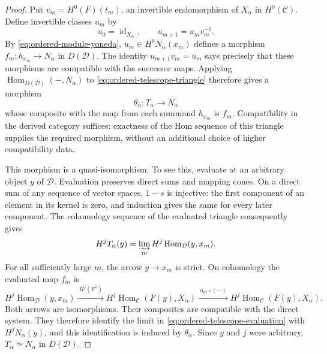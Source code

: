 \documentclass[11pt]{article}
\numberwithin{equation}{section}
\theoremstyle{definition}
\theoremstyle{remark}
\newcommand{\Hom}{\operatorname{Hom}}
\newcommand{\id}{\operatorname{id}}
\begin{document}
\begin{proof}
Put $v_m=H^0(F)(t_m)$, an invertible endomorphism of $X_\alpha$ in
$H^0(\mathcal C)$.  Define invertible classes $u_m$ by
\[
 u_0=\id_{X_\alpha},\qquad u_{m+1}=u_m v_m^{-1}.
\]
By \eqref{eq:ordered-module-yoneda}, $u_m\in H^0N_\alpha(x_m)$ defines
a morphism $f_m:h_{x_m}\to N_\alpha$ in $D(\mathcal D)$.  The identity
$u_{m+1}v_m=u_m$ says precisely that these morphisms are compatible with
the successor maps.  Applying $\Hom_{D(\mathcal D)}(-,N_\alpha)$ to
\eqref{eq:ordered-telescope-triangle} therefore gives a morphism
\[
 \theta_\alpha:T_\alpha\longrightarrow N_\alpha
\]
whose composite with the map from each summand $h_{x_m}$ is $f_m$.
Compatibility in the derived category suffices: exactness of the Hom
sequence of this triangle supplies the required morphism, without an
additional choice of higher compatibility data.

This morphism is a quasi-isomorphism.  To see this, evaluate at an
arbitrary object $y$ of $\mathcal D$.  Evaluation preserves direct sums
and mapping cones.  On a direct sum of any sequence of vector spaces,
$1-s$ is injective: the first component of an element in its kernel is
zero, and induction gives the same for every later component.  The
cohomology sequence of the evaluated triangle consequently gives
\begin{equation}
 H^j T_\alpha(y)
 =\varinjlim_m H^j\Hom_{\mathcal D}(y,x_m).
 \label{eq:ordered-telescope-evaluation}
\end{equation}
For all sufficiently large $m$, the arrow $y\to x_m$ is strict.  On
cohomology the evaluated map $f_m$ is
\[
 H^j\Hom_{\mathcal D}(y,x_m)
 \xrightarrow{\ H^j(F^1)\ }
 H^j\Hom_{\mathcal C}(F(y),X_\alpha)
 \xrightarrow{\ u_m\circ(-)\ }
 H^j\Hom_{\mathcal C}(F(y),X_\alpha).
\]
Both arrows are isomorphisms.  Their composites are compatible with
the direct system.  They therefore identify the limit in
\eqref{eq:ordered-telescope-evaluation} with $H^jN_\alpha(y)$, and this
identification is induced by $\theta_\alpha$.  Since $y$ and $j$ were
arbitrary, $T_\alpha\simeq N_\alpha$ in $D(\mathcal D)$.


\end{proof}
\end{document}
